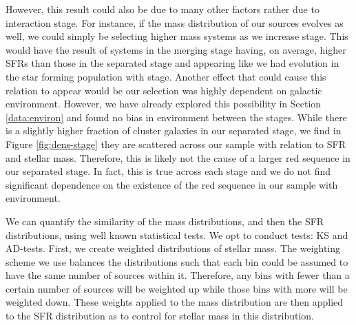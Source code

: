 However, this result could also be due to many other factors rather due to interaction stage. For instance, if the mass distribution of our sources evolves as well, we could simply be selecting higher mass systems as we increase stage. This would have the result of systems in the merging stage having, on average, higher SFRs than those in the separated stage and appearing like we had evolution in the star forming population with stage. Another effect that could cause this relation to appear would be our selection was highly dependent on galactic environment. However, we have already explored this possibility in Section \ref{data:environ} and found no bias in environment between the stages. While there is a slightly higher fraction of cluster galaxies in our separated stage, we find in Figure \ref{fig:dens-stage} they are scattered across our sample with relation to SFR and stellar mass. Therefore, this is likely not the cause of a larger red sequence in our separated stage. In fact, this is true across each stage and we do not find significant dependence on the existence of the red sequence in our sample with environment.

We can quantify the similarity of the mass distributions, and then the SFR distributions, using well known statistical tests. We opt to conduct tests: KS and AD-tests. First, we create weighted distributions of stellar mass. The weighting scheme we use balances the distributions such that each bin could be assumed to have the same number of sources within it. Therefore, any bins with fewer than a certain number of sources will be weighted up while those bins with more will be weighted down. These weights applied to the mass distribution are then applied to the SFR distribution as to control for stellar mass in this distribution.

